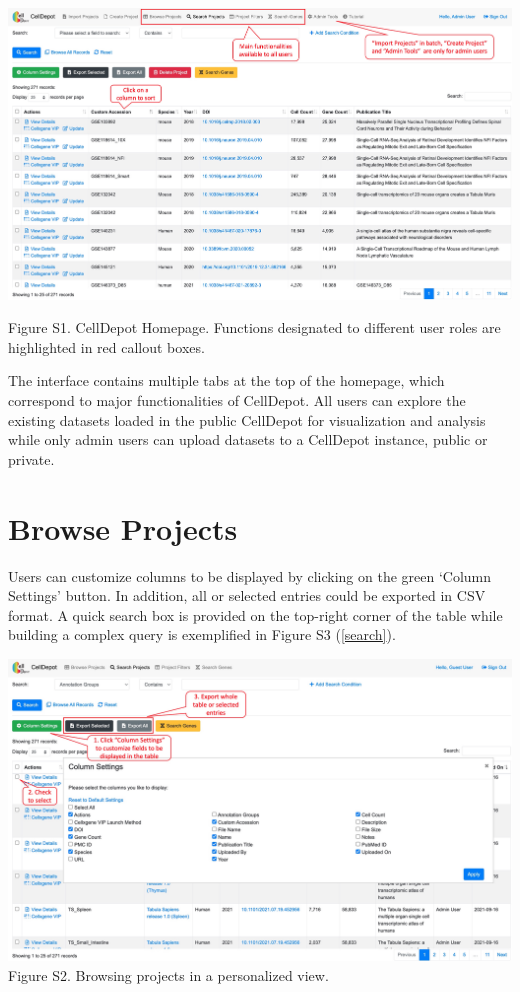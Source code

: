 \documentclass[
  openany]{book}
\begin{document}
\href{figures/S1.jpg}{\includegraphics{figures/S1.jpg}}

Figure S1. CellDepot Homepage. Functions designated to different user roles are highlighted in red callout boxes.

The interface contains multiple tabs at the top of the homepage, which correspond to major functionalities of CellDepot. All users can explore the existing datasets loaded in the public CellDepot for visualization and analysis while only admin users can upload datasets to a CellDepot instance, public or private.

\hypertarget{browse-projects}{%
\section{Browse Projects}\label{browse-projects}}

Users can customize columns to be displayed by clicking on the green `Column Settings' button. In addition, all or selected entries could be exported in CSV format. A quick search box is provided on the top-right corner of the table while building a complex query is exemplified in Figure S3 (\ref{search}).

\href{figures/S2.jpg}{\includegraphics{figures/S2.jpg}}
Figure S2. Browsing projects in a personalized view.
\end{document}
